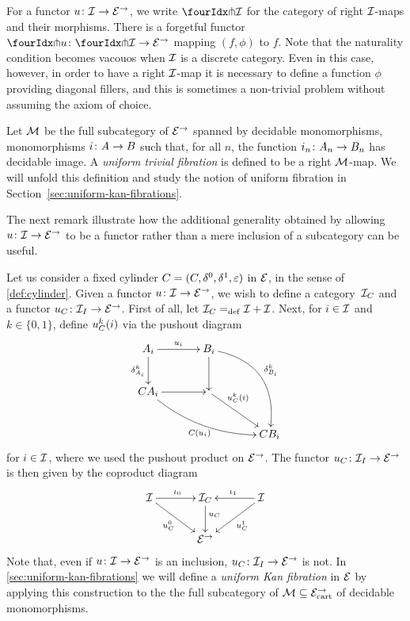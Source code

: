 \documentclass[reqno,10pt,a4paper,oneside]{amsart}
\begin{document}
For a functor $u \co \cal{I} \to \catE^\to$, we write $\liftr{\cal{I}}$ for the category  of 
right $\cal{I}$-maps and their morphisms. There is a forgetful functor~$\liftr{u} \co \liftr{\cal{I}} \to \catE^\to$
mapping $(f, \phi)$ to $f$. Note that the naturality condition becomes vacouos when $\cal{I}$ is a discrete category. Even in this case, however, in order to have a right $\cal{I}$-map it is necessary to define a function $\phi$ providing 
diagonal fillers, and this is sometimes a non-trivial problem without assuming the axiom of choice.



\begin{example}  \label{exa-triv-kan-fib}
Let $\cal{M}$ be the full subcategory of $\cal{E}^\to$ spanned by decidable monomorphisms, \ie
monomorphisms $i \co A \to B$ such that, for all $n$, the function $i_n \co A_n \to B_n$ has decidable
image. A \emph{uniform trivial fibration} is defined to be a right $\cal{M}$-map. We will unfold this
definition and study the notion of uniform  fibration in Section~\ref{sec:uniform-kan-fibrations}.
\end{example}


The next remark illustrate how the additional generality obtained by allowing $u \co \cal{I} \to \catE^\to$ to be a functor rather than a mere inclusion of a  subcategory can be useful.  


\begin{remark}  \label{rem:u-to-ucyl}
Let us consider a fixed cylinder $\cyl = (\cyl, \lcyl, \rcyl, \ccyl)$ in $\catE$, in the sense of \cref{def:cylinder}. 
Given a functor $u \co \cal{I} \to \catE^\to$, we wish to define a category~$\cal{I}_\cyl$ and a functor $u_\cyl \co \cal{I}_\interval \to \catE^\to$. First of all, let $\cal{I}_\cyl
\defeq \cal{I} + \cal{I}$.
 Next, for $i \in \cal{I}$ and $k \in \{ 0, 1 \}$, define $u_\cyl^k(i)$ via the pushout diagram
 \[
\xymatrix@C=1.2cm{
A_i \ar[r]^{u_i}  \ar[d]_{\kcyl_{A_i}} & B_i  \ar@/^2pc/[ddr]^{\kcyl_{B_i}} \ar[d] & \\ 
\cyl A_i \ar@/_1pc/[drr]_{\cyl (u_i)} \ar[r] &  \ar[dr]^-(.35){u_\cyl^k(i)}  & \\ 
 & & \cyl B_i} 
 \]
for $i \in \cal{I}$, where we used the pushout product on $\catE^\to$. The functor $u_\cyl \co \cal{I}_\interval \to \catE^\to$ is then given by the coproduct diagram
\begin{equation}
\label{equ:u-interval}
\vcenter{\hbox{\xymatrix@C=1.2cm{
\cal{I} \ar[r]^{\iota_0} \ar[dr]_-{u_\cyl^0} & \cal{I}_\cyl \ar[d]^(.4){u_\cyl} & \cal{I} \ar[dl]^-{u_\cyl^1} \ar[l]_{\iota_1} \\ 
 & \catE^\to }}}
\end{equation}
Note that, even if $u \co \cal{I} \to \catE^\to$ is an inclusion, $u_\cyl \co \cal{I}_\interval \to \catE^\to$ is not.
In \cref{sec:uniform-kan-fibrations} we will define a \emph{uniform Kan fibration} in $\cal{E}$ by applying
this construction to the the full subcategory of $\cal{M} \subseteq \cal{E}^\to_\cart$ of decidable monomorphisms.
\end{remark} 
\end{document}
